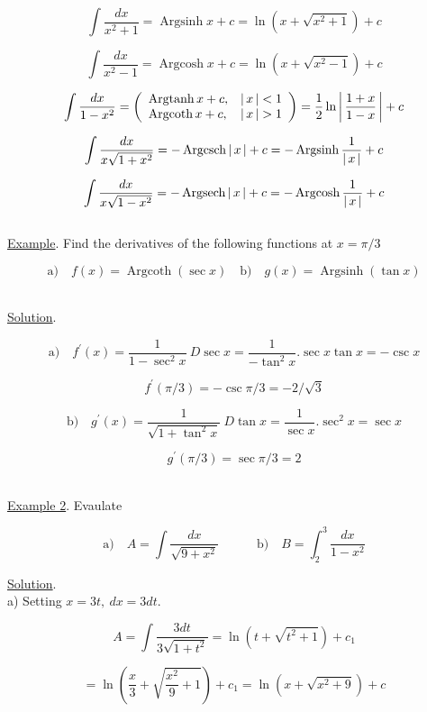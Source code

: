 \documentclass[11pt]{amsbook}
\DeclareMathOperator{\arcsinh}{Argsinh}
\DeclareMathOperator{\arccosh}{Argcosh}
\DeclareMathOperator{\arctanh}{Argtanh}
\DeclareMathOperator{\arccoth}{Argcoth}
\DeclareMathOperator{\arcsech}{Argsech}
\DeclareMathOperator{\arccsch}{Argcsch}
\begin{document}

\[\int\frac{dx}{x^2+1} = \arcsinh x + c = \ln(x + \sqrt{x^2+1}) + c\]

\[\int\frac{dx}{x^2-1} = \arccosh x + c = \ln(x + \sqrt{x^2-1}) + c\]

\[\int\frac{dx}{1-x^2} = \left( 
							\begin{array}{ll} 
								\arctanh x + c, & \hAbs{x} < 1 \\
                     			\arccoth x + c, &  \hAbs{x} > 1
       						\end{array} 
       					\right)
       				  = \frac{1}{2} \ln\hAbs{\frac{1+x}{1-x}} + c\]

\[\int\frac{dx}{x\sqrt{1+x^2}} = -\arccsch\hAbs{x} + c = -\arcsinh\frac{1}{\hAbs{x}} + c\]

\[\int\frac{dx}{x\sqrt{1-x^2}} = -\arcsech\hAbs{x} + c = -\arccosh\frac{1}{\hAbs{x}} + c\]\\

\underline{Example}. Find the derivatives of the following functions at $x = \pi /3$

\[\text{a)} \quad f(x) = \arccoth(\sec x) \quad \text{b)} \quad g(x) = \arcsinh(\tan x)\]\

\underline{Solution}.

\[\text{a)} \quad f^\prime(x) = \frac{1}{1-\sec^2x} \ D\sec x = \frac{1}{-\tan^2x}.\sec x \tan x = -\csc x\]

\quad \[f^\prime(\pi / 3) = -\csc \pi / 3 = -2/\sqrt{3}\]

\[\text{b)} \quad g^\prime(x) = \frac{1}{\sqrt{1+\tan^2x}} \ D\tan x = \frac{1}{\sec x}.\sec^2 x = \sec x\]

\quad \[g^\prime(\pi / 3) = \sec \pi / 3 = 2\]\

\underline{Example 2}. Evaulate

\[\text{a)} \quad A = \int\frac{dx}{\sqrt{9+x^2}} \quad\quad\quad \text{b)} \quad B = \int_2^3\frac{dx}{1-x^2}\]

\underline{Solution}.\\

a) Setting $x = 3t, \ dx = 3dt.$

\[A = \int\frac{3dt}{3\sqrt{1+t^2}} = \ln(t + \sqrt{t^2+1}) + c_1\]

\[= \ln(\frac{x}{3} + \sqrt{\frac{x^2}{9}+1}) + c_1 = \ln(x + \sqrt{x^2+9}) + c\]
\end{document}

